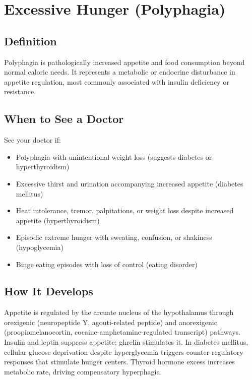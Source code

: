 \chapter{Excessive Hunger (Polyphagia)}

\section*{Definition}
Polyphagia is pathologically increased appetite and food consumption beyond normal caloric needs. It represents a metabolic or endocrine disturbance in appetite regulation, most commonly associated with insulin deficiency or resistance.

\section*{When to See a Doctor}
See your doctor if:
\begin{itemize}
  \item Polyphagia with unintentional weight loss (suggests diabetes or hyperthyroidism)
  \item Excessive thirst and urination accompanying increased appetite (diabetes mellitus)
  \item Heat intolerance, tremor, palpitations, or weight loss despite increased appetite (hyperthyroidism)
  \item Episodic extreme hunger with sweating, confusion, or shakiness (hypoglycemia)
  \item Binge eating episodes with loss of control (eating disorder)
\end{itemize}

\section*{How It Develops}
Appetite is regulated by the arcuate nucleus of the hypothalamus through orexigenic (neuropeptide Y, agouti-related peptide) and anorexigenic (proopiomelanocortin, cocaine-amphetamine-regulated transcript) pathways. Insulin and leptin suppress appetite; ghrelin stimulates it. In diabetes mellitus, cellular glucose deprivation despite hyperglycemia triggers counter-regulatory responses that stimulate hunger centers. Thyroid hormone excess increases metabolic rate, driving compensatory hyperphagia.

